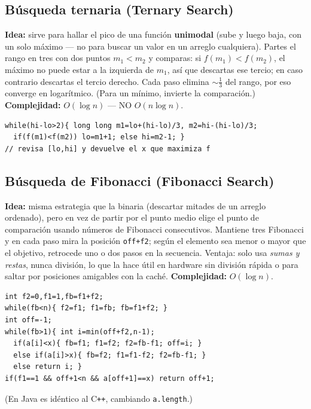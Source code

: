 \documentclass[10pt,a4paper,twocolumn]{article}
\begin{document}
\subsection{Búsqueda ternaria (Ternary Search)}
\textbf{Idea:} sirve para hallar el pico de una función
\textbf{unimodal} (sube y luego baja, con un solo máximo — no para buscar
un valor en un arreglo cualquiera). Partes el rango en tres con dos
puntos $m_1<m_2$ y comparas: si $f(m_1)<f(m_2)$, el máximo no puede estar
a la izquierda de $m_1$, así que descartas ese tercio; en caso contrario
descartas el tercio derecho. Cada paso elimina $\sim\frac{1}{3}$ del
rango, por eso converge en logarítmico. (Para un mínimo, invierte la
comparación.) \textbf{Complejidad:} $O(\log n)$ — NO $O(n\log n)$.
\begin{lstlisting}[style=cpp]
while(hi-lo>2){ long long m1=lo+(hi-lo)/3, m2=hi-(hi-lo)/3;
  if(f(m1)<f(m2)) lo=m1+1; else hi=m2-1; }
// revisa [lo,hi] y devuelve el x que maximiza f
\end{lstlisting}


\subsection{Búsqueda de Fibonacci (Fibonacci Search)}
\textbf{Idea:} misma estrategia que la binaria (descartar mitades de un
arreglo ordenado), pero en vez de partir por el punto medio elige el
punto de comparación usando números de Fibonacci consecutivos. Mantiene
tres Fibonacci y en cada paso mira la posición \texttt{off+f2}; según el
elemento sea menor o mayor que el objetivo, retrocede uno o dos pasos en
la secuencia. Ventaja: solo usa \emph{sumas y restas}, nunca división,
lo que la hace útil en hardware sin división rápida o para saltar por
posiciones amigables con la caché. \textbf{Complejidad:} $O(\log n)$.
\begin{lstlisting}[style=cpp]
int f2=0,f1=1,fb=f1+f2;
while(fb<n){ f2=f1; f1=fb; fb=f1+f2; }
int off=-1;
while(fb>1){ int i=min(off+f2,n-1);
  if(a[i]<x){ fb=f1; f1=f2; f2=fb-f1; off=i; }
  else if(a[i]>x){ fb=f2; f1=f1-f2; f2=fb-f1; }
  else return i; }
if(f1==1 && off+1<n && a[off+1]==x) return off+1;
\end{lstlisting}

(En Java es idéntico al C\texttt{++}, cambiando \texttt{a.length}.)
\end{document}
